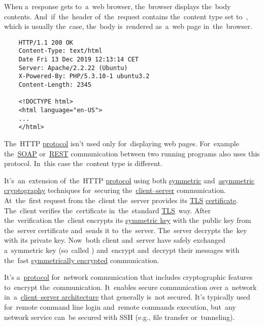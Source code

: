 When a~response gets to~a~web browser, the~browser displays the~body contents.
And~if~the~header of~the~request contains the~content type set to~, which is usually the~case, the~body is~rendered as~a~web page in~the~browser.

\begin{lstlisting}
    HTTP/1.1 200 OK
    Content-Type: text/html
    Date Fri 13 Dec 2019 12:13:14 CET
    Server: Apache/2.2.22 (Ubuntu)
    X-Powered-By: PHP/5.3.10-1 ubuntu3.2
    Content-Length: 2345

    <!DOCTYPE html>
    <html language="en-US">
    ...
    </html>
\end{lstlisting}
\notenonl The~HTTP \hyperref[protocolstandard]{protocol} isn't used only for~displaying web pages.
For~example the~\hyperref[soap]{SOAP} or~\hyperref[rest]{REST} communication between two running programs also uses this protocol.
In~this case the~content type is different.

\label{https}
It's~an~extension of~the~HTTP \hyperref[protocolstandard]{protocol} using both \hyperref[symmetriccryptography]{symmetric} and~\hyperref[asymmetriccryptography]{asymmetric} \hyperref[cryptography]{cryptography} techniques for~securing the~\hyperref[clientserverarchitecture]{client--server} communication.
At~the~first request from the~client the~server provides its \hyperref[tls]{TLS} \hyperref[certificate]{certificate}.
The~client verifies the~certificate in~the~standard \hyperref[tls]{TLS}~way.
After the~verification the~client encrypts its \hyperref[symmetriccryptography]{symmetric key} with the~public key from the~server certificate and~sends it to~the~server.
The~server decrypts the~key with its private key.
Now~both client and~server have safely exchanged a~symmetric key (so~called ) and~encrypt and~decrypt their messages with the~fast \hyperref[symmetriccryptography]{symmetrically encrypted} communication.

\label{smtp}

\label{ssh}
It's a~\hyperref[protocolstandard]{protocol} for~network communication that includes cryptographic features to~encrypt the~communication.
It~enables secure communication over a~network in~a~\hyperref[clientserverarchitecture]{client--server architecture} that generally is~not secured.
It's typically used for~remote command line login and~remote commands execution, but~any network service can~be secured with SSH (e.g., file transfer or~tunneling).

